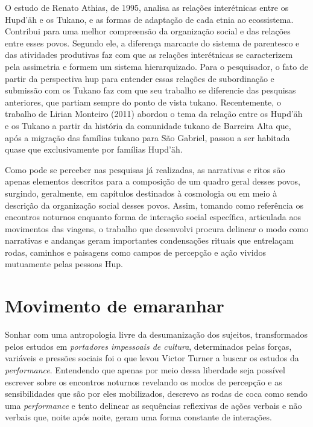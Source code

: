 O estudo de Renato Athias, de 1995, analisa as relações interétnicas
entre os Hupd'äh e os Tukano, e as formas de adaptação de cada etnia ao
ecossistema. Contribui para uma melhor compreensão da organização social
e das relações entre esses povos. Segundo ele, a diferença marcante do
sistema de parentesco e das atividades produtivas faz com que as
relações interétnicas se caracterizem pela assimetria e formem um
sistema hierarquizado. Para o pesquisador, o fato de partir da
perspectiva hup para entender essas relações de subordinação e submissão
com os Tukano faz com que seu trabalho se diferencie das pesquisas
anteriores, que partiam sempre do ponto de vista tukano. Recentemente, o
trabalho de Lirian Monteiro (2011) abordou o tema da relação entre os
Hupd'äh e os Tukano a partir da história da comunidade tukano de
Barreira Alta que, após a migração das famílias tukano para São Gabriel,
passou a ser habitada quase que exclusivamente por famílias Hupd'äh.

Como pode se perceber nas pesquisas já realizadas, as narrativas e ritos
são apenas elementos descritos para a composição de um quadro geral
desses povos, surgindo, geralmente, em capítulos destinados à cosmologia
ou em meio à descrição da organização social desses povos. Assim,
tomando como referência os encontros noturnos enquanto forma de
interação social específica, articulada aos movimentos das viagens, o
trabalho que desenvolvi procura delinear o modo como narrativas e
andanças geram importantes condensações rituais que entrelaçam rodas,
caminhos e paisagens como campos de percepção e ação vividos mutuamente
pelas pessoas Hup.

\section{Movimento de emaranhar}\label{movimentos-de-emaranhar}

Sonhar com uma antropologia livre da desumanização dos sujeitos,
transformados pelos estudos em \textit{portadores impessoais de cultura},
determinados pelas forças, variáveis e pressões sociais foi o que levou
Victor Turner a buscar os estudos da \textit{performance}. Entendendo que
apenas por meio dessa liberdade seja possível escrever sobre os
encontros noturnos revelando os modos de percepção e as sensibilidades
que são por eles mobilizados, descrevo as rodas de coca como sendo uma
\textit{performance} e tento delinear as sequências reflexivas de ações
verbais e não verbais que, noite após noite, geram uma forma constante
de interações.

